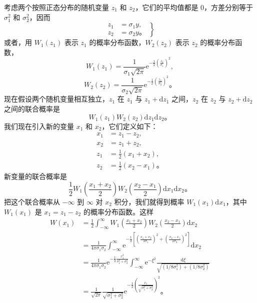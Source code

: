 考虑两个按照正态分布的随机变量 $z_1$ 和 $z_2$，它们的平均值都是 $0$，方差分别等于 $\sigma_1^2$ 和 $\sigma_2^2$，因而
\begin{equation}
\left.
\begin{aligned}
z_1 &= \sigma_1 y, \\
z_2 &= \sigma_2 y。
\end{aligned}
\right\}
\label{eq:ch18_two_normal_vars_def}
\end{equation}
或者，用 $W_1(z_1)$ 表示 $z_1$ 的概率分布函数，$W_2(z_2)$ 表示 $z_2$ 的概率分布函数，
\begin{equation*}
W_1(z_1) = \frac{1}{\sigma_1\sqrt{2\pi}} \mathrm{e}^{-\frac{1}{2}\left(\frac{z_1}{\sigma_1}\right)^2},
\end{equation*}
\begin{equation*}
W_2(z_2) = \frac{1}{\sigma_2\sqrt{2\pi}} \mathrm{e}^{-\frac{1}{2}\left(\frac{z_2}{\sigma_2}\right)^2}。
\end{equation*}
现在假设两个随机变量相互独立，$z_1$ 在 $z_1$ 与 $z_1+\mathrm{d}z_1$ 之间，$z_2$ 在 $z_2$ 与 $z_2+\mathrm{d}z_2$ 之间的联合概率是
\begin{equation*}
W_1(z_1)W_2(z_2)\mathrm{d}z_1\mathrm{d}z_2。
\end{equation*}
我们现在引入新的变量 $x_1$ 和 $x_2$，它们定义如下：
\begin{equation*}
\begin{aligned}
x_1 &= z_1 - z_2, \\
x_2 &= z_1 + z_2, \\
z_1 &= \frac{1}{2}(x_1 + x_2), \\
z_2 &= \frac{1}{2}(x_2 - x_1)。
\end{aligned}
\end{equation*}
新变量的联合概率是
\begin{equation*}
\frac{1}{2}W_1\left(\frac{x_1+x_2}{2}\right)W_2\left(\frac{x_2-x_1}{2}\right)\mathrm{d}x_1\mathrm{d}x_2。
\end{equation*}
把这个联合概率从 $-\infty$ 到 $\infty$ 对 $x_2$ 积分，我们就得到概率 $W_1(x_1)\mathrm{d}x_1$，其中 $W_1(x_1)$ 是 $x_1=z_1-z_2$ 的概率分布函数。这样
\begin{equation*}
\begin{aligned}
W(x_1) &= \frac{1}{2}\int_{-\infty}^{\infty} W_1\left(\frac{x_1+x_2}{2}\right)W_2\left(\frac{x_2-x_1}{2}\right)\mathrm{d}x_2 \\
&= \frac{1}{4\pi\sigma_1\sigma_2}\int_{-\infty}^{\infty} \mathrm{e}^{-\frac{1}{2}\left[\left(\frac{x_1+x_2}{2\sigma_1}\right)^2+\left(\frac{x_2-x_1}{2\sigma_2}\right)^2\right]} \mathrm{d}x_2 \\
&= \frac{1}{4\pi\sigma_1\sigma_2}\mathrm{e}^{-\frac{1}{2}\frac{x_1^2}{\sigma_1^2+\sigma_2^2}} \int_{-\infty}^{\infty} \mathrm{e}^{-\xi^2} \frac{\mathrm{d}\xi}{\sqrt{(1/8\sigma_1^2)+(1/8\sigma_2^2)}} \\
&= \frac{1}{\sqrt{2\pi}} \frac{1}{\sqrt{\sigma_1^2+\sigma_2^2}}\mathrm{e}^{-\frac{1}{2}\left(\frac{x_1}{\sqrt{\sigma_1^2+\sigma_2^2}}\right)^2}。
\end{aligned}
\end{equation*}
